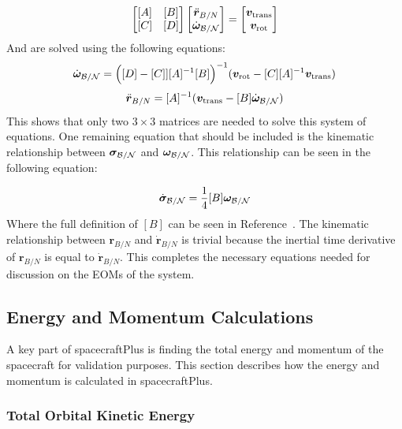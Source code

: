 \begin{equation}
\begin{bmatrix}
[A] & [B]\\
[C] & [D]
\end{bmatrix} \begin{bmatrix}
\ddot{\bm r}_{B/N}\\
\dot{\bm\omega}_{\cal B/N}
\end{bmatrix} = \begin{bmatrix}
\bm v_{\text{trans}}\\
\bm v_{\text{rot}}
\end{bmatrix}
\label{eq:backSub}
\end{equation}
And are solved using the following equations:
\begin{equation}
\dot{\bm\omega}_{\cal B/N} = \Big([D] - [C]][A]^{-1}[B]\Big)^{-1}(\bm v_{\text{rot}} - [C][A]^{-1}\bm v_{\text{trans}})
\end{equation}
\begin{equation}
\ddot{\bm r}_{B/N} = [A]^{-1} (\bm v_{\text{trans}} - [B]\dot{\bm\omega}_{\cal B/N})
\end{equation}
This shows that only two $3\times 3$ matrices are needed to solve this system of equations. One remaining equation that should be included is the kinematic relationship between $\bm \sigma_{\cal{B}/\cal{N}}$ and $\bm \omega_{\cal{B}/\cal{N}}$. This relationship can be seen in the following equation:

\begin{equation}
\dot{\bm \sigma}_{\cal{B}/\cal{N}} = \frac{1}{4} [B]\bm \omega_{\cal{B}/\cal{N}}
\end{equation}
Where the full definition of $[B]$ can be seen in Reference~\cite{schaub}. The kinematic relationship between $\bm r_{B/N}$ and $\dot{\bm r}_{B/N}$ is trivial because the inertial time derivative of $\bm r_{B/N}$ is equal to $\dot{\bm r}_{B/N}$. This completes the necessary equations needed for discussion on the EOMs of the system.

\subsection{Energy and Momentum Calculations}

A key part of spacecraftPlus is finding the total energy and momentum of the spacecraft for validation purposes. This section describes how the energy and momentum is calculated in spacecraftPlus.

\subsubsection{Total Orbital Kinetic Energy}

